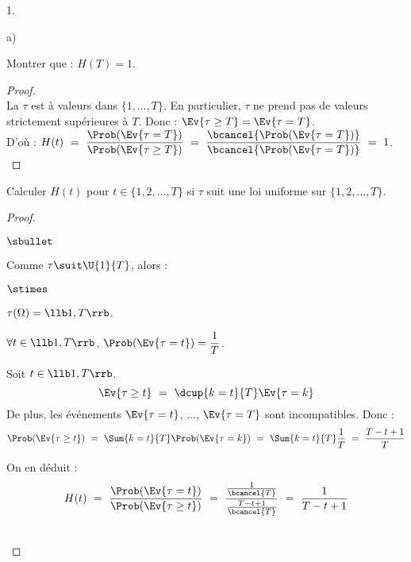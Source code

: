 \documentclass[11pt]{article}%
\begin{document}
\begin{noliste}{1.}
\begin{noliste}{a)}
    
    \item Montrer que : $H(T)=1$.
    
    \begin{proof}~\\
      La \var $\tau$ est à valeurs dans $\{1, \ldots, T\}$. En 
      particulier, $\tau$ ne prend pas de valeurs strictement 
      supérieures à $T$.
      Donc : $\Ev{\tau \geq T} = \Ev{\tau = T}$.\\[.1cm]
      D'où : $H(t) \ = \ \dfrac{\Prob(\Ev{\tau = T})}
      {\Prob(\Ev{\tau \geq T})} \ = \ \dfrac{\bcancel{\Prob(
      \Ev{\tau =T})}}{\bcancel{\Prob(\Ev{\tau =T})}} \ = \ 1$.
      ~\\[-1cm]
    \end{proof}
    
    

    
    \item Calculer $H(t)$ pour $t\in \{1,2, \ldots, T\}$ si $\tau$ 
    suit une loi uniforme sur $\{1,2, \ldots, T\}$.
    
    \begin{proof}~
      \begin{noliste}{$\sbullet$}
	\item Comme $\tau \suit \U{1}{T}$, alors :
	\begin{noliste}{$\stimes$}
	  \item $\tau(\Omega) = \llb 1, T\rrb$.
	  \item $\forall t \in \llb 1, T \rrb$, $\Prob(\Ev{\tau =t})
	  =\dfrac{1}{T}$.
	\end{noliste}
	
	\item Soit $t\in \llb 1, T\rrb$.
	\[
	  \Ev{\tau \geq t} \ = \ \dcup{k=t}{T} \Ev{\tau =k}
	\]
	De plus, les événements $\Ev{\tau=t}$, $\ldots$, $\Ev{\tau =
	T}$ sont incompatibles. Donc :
	\[
	  \Prob(\Ev{\tau \geq t}) \ = \ \Sum{k=t}{T} 
	  \Prob(\Ev{\tau =k}) \ = \ \Sum{k=t}{T} \dfrac{1}{T}
	  \ = \ \dfrac{T-t+1}{T}
	\]
	
	\item On en déduit :
	\[
	  H(t) \ = \ \dfrac{\Prob(\Ev{\tau =t})}{\Prob(\Ev{\tau \geq 
	  t})} \ = \ \dfrac{\frac{1}{\bcancel{T}}}{\frac{T-t+1}
	  {\bcancel{T}}} \ = \ \dfrac{1}{T-t+1}
	\]
      \end{noliste}
      ~\\[-1cm]
    \end{proof}


\end{noliste}
\end{noliste}
\end{document}
